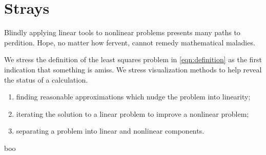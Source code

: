 \chapter{Strays}

Blindly applying linear tools to nonlinear problems presents many paths to perdition. Hope, no matter how fervent, cannot remedy mathematical maladies.

We stress the definition of the least squares problem in \eqref{eqn:definition} as the first indication that something is amiss. We stress visualization methods to help reveal the status of a calculation.
\begin{enumerate}
\item finding reasonable approximations which nudge the problem into linearity;
\item iterating the solution to a linear problem to improve a nonlinear problem; 
\item separating a problem into linear and nonlinear components.
\end{enumerate}


boo



\endinput  %